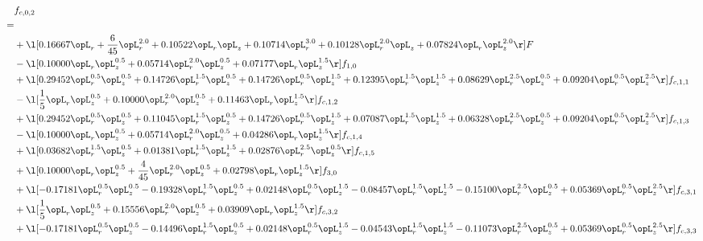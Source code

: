 \begin{alignat}{2} 
\label{eq:f_02_2} 
& f_{c,0,2} \nonumber \\ 
 = \\ 
& + \l[  0.16667 \opL_r + \frac{6}{45} \opL_r^{2.0} +  0.10522 \opL_r \opL_z +  0.10714 \opL_r^{3.0} +  0.10128 \opL_r^{2.0} \opL_z +  0.07824 \opL_r \opL_z^{2.0}  \r] F \nonumber \\ 
& - \l[  0.10000 \opL_r \opL_z^{0.5} +  0.05714 \opL_r^{2.0} \opL_z^{0.5} +  0.07177 \opL_r \opL_z^{1.5}  \r] f_{1,0} \nonumber \\ 
& + \l[  0.29452 \opL_r^{0.5} \opL_z^{0.5} +  0.14726 \opL_r^{1.5} \opL_z^{0.5} +  0.14726 \opL_r^{0.5} \opL_z^{1.5} +  0.12395 \opL_r^{1.5} \opL_z^{1.5} +  0.08629 \opL_r^{2.5} \opL_z^{0.5} +  0.09204 \opL_r^{0.5} \opL_z^{2.5}  \r] f_{c,1,1} \nonumber \\ 
& - \l[ \frac{1}{5} \opL_r \opL_z^{0.5} +  0.10000 \opL_r^{2.0} \opL_z^{0.5} +  0.11463 \opL_r \opL_z^{1.5}  \r] f_{c,1,2} \nonumber \\ 
& + \l[  0.29452 \opL_r^{0.5} \opL_z^{0.5} +  0.11045 \opL_r^{1.5} \opL_z^{0.5} +  0.14726 \opL_r^{0.5} \opL_z^{1.5} +  0.07087 \opL_r^{1.5} \opL_z^{1.5} +  0.06328 \opL_r^{2.5} \opL_z^{0.5} +  0.09204 \opL_r^{0.5} \opL_z^{2.5}  \r] f_{c,1,3} \nonumber \\ 
& - \l[  0.10000 \opL_r \opL_z^{0.5} +  0.05714 \opL_r^{2.0} \opL_z^{0.5} +  0.04286 \opL_r \opL_z^{1.5}  \r] f_{c,1,4} \nonumber \\ 
& + \l[  0.03682 \opL_r^{1.5} \opL_z^{0.5} +  0.01381 \opL_r^{1.5} \opL_z^{1.5} +  0.02876 \opL_r^{2.5} \opL_z^{0.5}  \r] f_{c,1,5} \nonumber \\ 
& + \l[  0.10000 \opL_r \opL_z^{0.5} + \frac{4}{45} \opL_r^{2.0} \opL_z^{0.5} +  0.02798 \opL_r \opL_z^{1.5}  \r] f_{3,0} \nonumber \\ 
& + \l[  -0.17181 \opL_r^{0.5} \opL_z^{0.5}   -0.19328 \opL_r^{1.5} \opL_z^{0.5} +  0.02148 \opL_r^{0.5} \opL_z^{1.5}   -0.08457 \opL_r^{1.5} \opL_z^{1.5}   -0.15100 \opL_r^{2.5} \opL_z^{0.5} +  0.05369 \opL_r^{0.5} \opL_z^{2.5}  \r] f_{c,3,1} \nonumber \\ 
& + \l[ \frac{1}{5} \opL_r \opL_z^{0.5} +  0.15556 \opL_r^{2.0} \opL_z^{0.5} +  0.03909 \opL_r \opL_z^{1.5}  \r] f_{c,3,2} \nonumber \\ 
& + \l[  -0.17181 \opL_r^{0.5} \opL_z^{0.5}   -0.14496 \opL_r^{1.5} \opL_z^{0.5} +  0.02148 \opL_r^{0.5} \opL_z^{1.5}   -0.04543 \opL_r^{1.5} \opL_z^{1.5}   -0.11073 \opL_r^{2.5} \opL_z^{0.5} +  0.05369 \opL_r^{0.5} \opL_z^{2.5}  \r] f_{c,3,3} \nonumber \\ 

\end{alignat}
